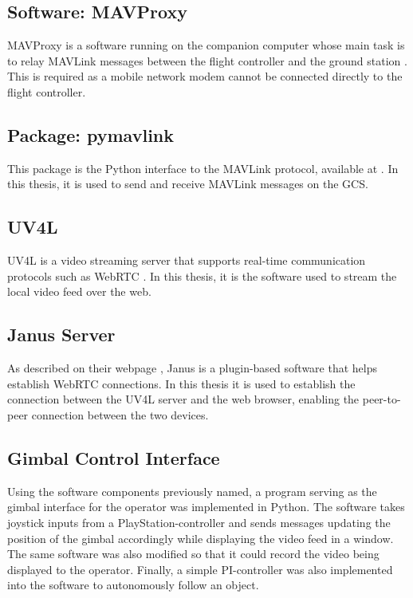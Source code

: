 \documentclass[nofilelist]{cslthse-msc}
\begin{document}

\subsection{Software: MAVProxy}
MAVProxy is a software running on the companion computer whose main task is to relay MAVLink messages between the flight controller and the ground station \cite{mavproxy}. This is required as a mobile network modem cannot be connected directly to the flight controller. 

\subsection{Package: pymavlink}
This package is the Python interface to the MAVLink protocol, available at \cite{pymavlink}. In this thesis, it is used to send and receive MAVLink messages on the GCS.

\subsection{UV4L}
UV4L is a video streaming server that supports real-time communication protocols such as WebRTC \cite{uv4l}. In this thesis, it is the software used to stream the local video feed over the web. 

\subsection{Janus Server}
As described on their webpage \cite{janus}, Janus is a plugin-based software that helps establish WebRTC connections. In this thesis it is used to establish the connection between the UV4L server and the web browser, enabling the peer-to-peer connection between the two devices.

\subsection{Gimbal Control Interface}
Using the software components previously named, a program serving as the gimbal interface for the operator was implemented in Python. The software takes joystick inputs from a PlayStation-controller and sends messages updating the position of the gimbal accordingly while displaying the video feed in a window. The same software was also modified so that it could record the video being displayed to the operator. Finally, a simple PI-controller was also implemented into the software to autonomously follow an object.
\end{document}
